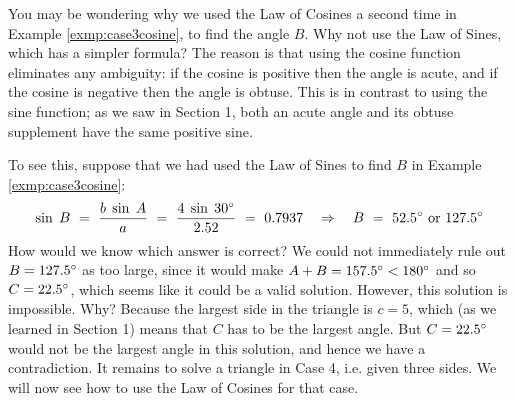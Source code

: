 You may be wondering why we used the Law of Cosines a second time in Example \ref{exmp:case3cosine},
to find the angle $B$. Why not use the Law of Sines, which has a simpler
formula?  The reason is that using the cosine function eliminates any ambiguity: if the cosine is
positive then the angle is acute, and if the cosine is negative then the angle is obtuse. This is in
contrast to using the sine function; as we saw in Section 1, both an acute angle and its obtuse
supplement have the same positive sine.

To see this, suppose that we had used the Law of Sines to find $B$ in Example
\ref{exmp:case3cosine}:
\begin{displaymath}
 \sin\;B ~=~ \frac{b\;\sin\;A}{a} ~=~ \frac{4\;\sin\;30^\circ}{2.52} ~=~ 0.7937
 \quad\Rightarrow\quad B ~=~ 52.5^\circ ~\text{or}~ 127.5^\circ
\end{displaymath}
How would we know which answer is correct? We could not immediately rule out $B = 127.5^\circ$ as
too large, since it would make $A + B = 157.5^\circ < 180^\circ$ and so $C = 22.5^\circ$,
which seems like it could be a valid solution. However, this solution is impossible. Why? Because
the largest side in the triangle is $c = 5$, which (as we learned in Section 1)
means that $C$ has to be the largest angle. But $C = 22.5^\circ$ would not be the largest angle
in this solution, and hence we have a contradiction.
\newpage
It remains to solve a triangle in Case 4, i.e. given three sides. We will now see how to use the
Law of Cosines for that case.

